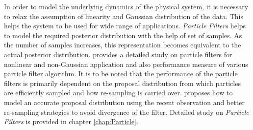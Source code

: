 In order to model the underlying dynamics of the physical system, it is necessary to relax the assumption of linearity and Gaussian distribution of the data. This helps the system to be used for wide range of applications. \textit{Particle Filters} helps to model the required posterior distribution with the help of set of samples. As the number of samples increases, this representation becomes equivalent to the actual posterior distribution. \cite{S.Arulampalam} provides a detailed study on particle filters for nonlinear and non-Gaussian application and also performance measure of various particle filter algorithm. It is to be noted that the performance of the particle filters is primarily dependent on the proposal distribution from which particles are efficiently sampled and how re-sampling is carried over. \cite{GMap_algo} proposes how to model an accurate proposal distribution using the recent observation and better re-sampling strategies to avoid divergence of the filter. Detailed study on \textit{Particle Filters} is provided in chapter \ref{chap:Particle}.

